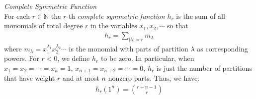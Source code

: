 \begin{definition} \emph{Complete Symmetric Function}{\label{CompSymFunc}}\\
	For each $r\in\mathbb{N}$ the $r$-th \emph{complete symmetric function} $h_{r}$ is the sum of all monomials of total degree $r$ in the variables $x_1, x_2, \cdots$ so that
	\begin{align}
		h_{r}=\sum_{|\lambda|=r}m_{\lambda}
	\end{align}
	 where $m_{\lambda}=x_1^{\lambda_1}x_2^{\lambda_2}\cdots$ is the monomial with parts of partition $\lambda$ as corresponding powers. For $r<0$, we  define $h_r$ to be zero. In particular, when $x_1=x_2=\cdots=x_n=1$, $x_{n+1}=x_{n+2}=\cdots=0$, $h_r$ is just the number of partitions that have weight $r$ and at most $n$ nonzero parts. Thus, we have: 
	 \begin{align}
	 	h_{r}(1^{n})=\binom{r+n-1}{r}
	 \end{align}
\end{definition}

